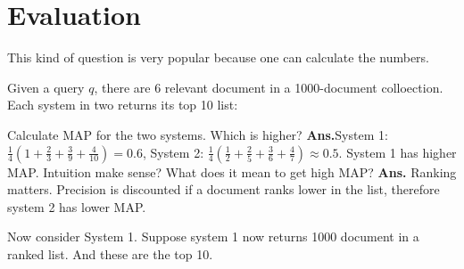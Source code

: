 \documentclass[11pt]{exam}
\newcommand{\ans}{\textbf{Ans.}}
\begin{document}
\section{Evaluation}
This kind of question is very popular because one can calculate the numbers.
\begin{questions}
  \question Given a query $q$, there are $6$ relevant document in a 1000-document 
 colloection. Each system in two returns its top 10 list:


\begin{subparts}
  \subpart Calculate MAP for the two systems. Which is higher? 
  \ans System 1: $\frac{1}{4}(1+\frac{2}{3} 
  +\frac{3}{9}+\frac{4}{10})=0.6$, System 2: $\frac{1}{4}(\frac{1}{2}+\frac{2}{5} 
  +\frac{3}{6}+\frac{4}{7})\approx 0.5$. System 1 has higher MAP.
  \subpart Intuition make sense? What does it mean to get high MAP? \ans
  Ranking matters. Precision is discounted if a document ranks lower in the 
  list, therefore system 2 has lower MAP.

Now consider System 1. Suppose system 1 now returns 1000 document in a ranked 
list. And these are the top 10.


\end{subparts}
\end{questions}
\end{document}
